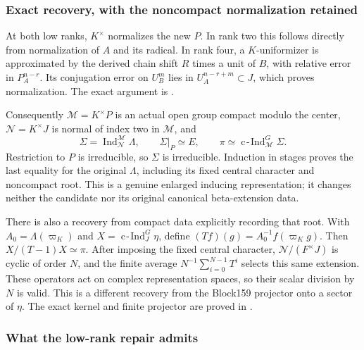 \hypertarget{dyadic_synthesis-exact-recovery-with-the-noncompact-normalization-retained}{%
\subsubsection{Exact recovery, with the noncompact normalization
retained}\label{dyadic_synthesis-exact-recovery-with-the-noncompact-normalization-retained}}

At both low ranks, \(K^\times\) normalizes the new \(P\). In rank two
this follows directly from normalization of \(A\) and its radical. In
rank four, a \(K\)-uniformizer is approximated by the derived chain
shift \(R\) times a unit of \(B\), with relative error in \(P_A^{n-r}\).
Its conjugation error on \(U_B^m\) lies in \(U_A^{n-r+m}\subset J\),
which proves normalization. The exact argument is
.

Consequently \(\mathcal M=K^\times P\) is an actual open group compact
modulo the center, \(\mathcal N=K^\times J\) is normal of index two in
\(\mathcal M\), and \[
\Sigma=\operatorname{Ind}_{\mathcal N}^{\mathcal M}\Lambda,
\qquad \Sigma|_P\simeq E,
\qquad
\boxed{\pi\simeq\operatorname{c\!-\!Ind}_{\mathcal M}^G\Sigma.}
\] Restriction to \(P\) is irreducible, so \(\Sigma\) is irreducible.
Induction in stages proves the last equality for the original
\(\Lambda\), including its fixed central character and noncompact root.
This is a genuine enlarged inducing representation; it changes neither
the candidate nor its original canonical beta-extension data.

There is also a recovery from compact data explicitly recording that
root. With \(A_0=\Lambda(\varpi_K)\) and
\(X=\operatorname{c\!-\!Ind}_J^G\eta\), define
\((Tf)(g)=A_0^{-1}f(\varpi_Kg)\). Then \(X/(T-1)X\simeq\pi\). After
imposing the fixed central character, \(\mathcal N/(F^\times J)\) is
cyclic of order \(N\), and the finite average
\(N^{-1}\sum_{i=0}^{N-1}T^i\) selects this same extension. These
operators act on complex representation spaces, so their scalar division
by \(N\) is valid. This is a different recovery from the Block159
projector onto a sector of \(\eta\). The exact kernel and finite
projector are proved in
.

\hypertarget{dyadic_synthesis-what-the-low-rank-repair-admits}{%
\subsubsection{What the low-rank repair
admits}\label{dyadic_synthesis-what-the-low-rank-repair-admits}}

